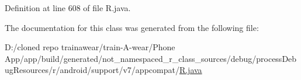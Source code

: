 Definition at line 608 of file R.\+java.



The documentation for this class was generated from the following file\+:\begin{DoxyCompactItemize}
\item 
D\+:/cloned repo trainawear/train-\/\+A-\/wear/\+Phone App/app/build/generated/not\+\_\+namespaced\+\_\+r\+\_\+class\+\_\+sources/debug/process\+Debug\+Resources/r/android/support/v7/appcompat/\mbox{\hyperlink{process_debug_resources_2r_2android_2support_2v7_2appcompat_2_r_8java}{R.\+java}}\end{DoxyCompactItemize}
